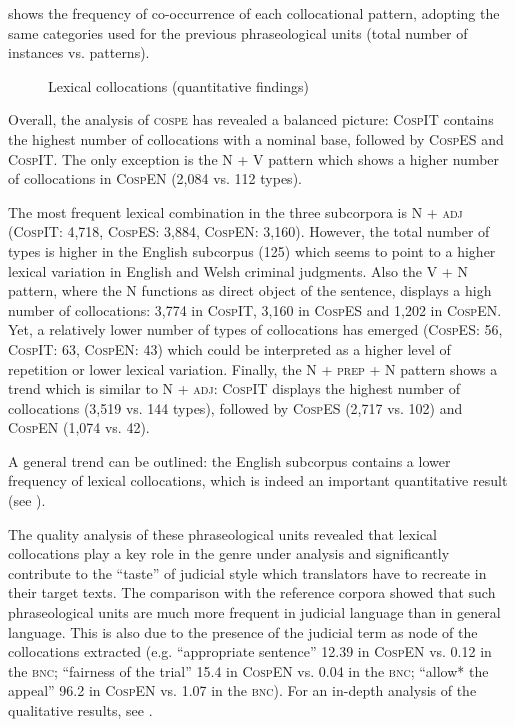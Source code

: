 \documentclass[output=paper]{LSP/langsci}
\begin{document}
 shows the frequency of co-occurrence of each collocational pattern, adopting the same categories used for the previous phraseological units (total number of instances vs. patterns).

\begin{figure}

\caption{Lexical collocations (quantitative findings)} \label{fig:6:3}
\end{figure}

Overall, the analysis of \textsc{cospe} has revealed a balanced picture: \textsc{\textsc{CospIT}} contains the highest number of collocations with a nominal base, followed by \textsc{CospES} and \textsc{\textsc{CospIT}}. The only exception is the N + V pattern which shows a higher number of collocations in \textsc{CospEN} (2,084 vs. 112 types).

The most frequent lexical combination in the three subcorpora is N + \textsc{adj} (\textsc{\textsc{CospIT}}: 4,718, \textsc{CospES}: 3,884, \textsc{CospEN}: 3,160). However, the total number of types is higher in the English subcorpus (125) which seems to point to a higher lexical variation in English and Welsh criminal judgments. Also the V + N pattern, where the N functions as direct object of the sentence, displays a high number of collocations: 3,774 in \textsc{\textsc{CospIT}}, 3,160 in \textsc{CospES} and 1,202 in \textsc{CospEN}. Yet, a relatively lower number of types of collocations has emerged (\textsc{CospES}: 56, \textsc{\textsc{CospIT}}: 63, \textsc{CospEN}: 43) which could be interpreted as a higher level of repetition or lower lexical variation. Finally, the N + \textsc{prep} + N pattern shows a trend which is similar to N + \textsc{adj}: \textsc{\textsc{CospIT}} displays the highest number of collocations (3,519 vs. 144 types), followed by \textsc{CospES} (2,717 vs. 102) and \textsc{CospEN} (1,074 vs. 42).

A general trend can be outlined: the English subcorpus contains a lower frequency of lexical collocations, which is \enlargethispage{1\baselineskip} indeed an important quantitative result (see ).

The quality analysis of these phraseological units revealed that lexical collocations play a key role in the genre under analysis and significantly contribute to the “taste” of judicial style which translators have to recreate in their target texts. The comparison with the reference corpora showed that such phraseological units are much more frequent in judicial language than in general language. This is also due to the presence of the judicial term as node of the collocations extracted (e.g. “appropriate sentence” 12.39 in \textsc{CospEN} vs. 0.12 in the \textsc{bnc}; “fairness of the trial” 15.4 in \textsc{CospEN} vs. 0.04 in the \textsc{bnc}; “allow* the appeal” 96.2 in \textsc{CospEN} vs. 1.07 in the \textsc{bnc}). For an in-depth analysis of the qualitative results, see \citep[241--252][]{Pontrandolfo2013a}.
\end{document}

